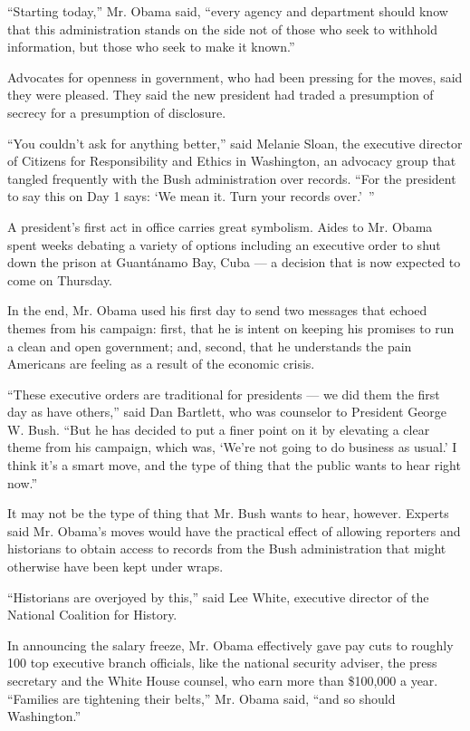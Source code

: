``Starting today,'' Mr. Obama said, ``every agency and department should
know that this administration stands on the side not of those who seek
to withhold information, but those who seek to make it known.''

Advocates for openness in government, who had been pressing for the
moves, said they were pleased. They said the new president had traded a
presumption of secrecy for a presumption of disclosure.

``You couldn't ask for anything better,'' said Melanie Sloan, the
executive director of Citizens for Responsibility and Ethics in
Washington, an advocacy group that tangled frequently with the Bush
administration over records. ``For the president to say this on Day 1
says: `We mean it. Turn your records over.'~''

A president's first act in office carries great symbolism. Aides to Mr.
Obama spent weeks debating a variety of options including an executive
order to shut down the prison at Guantánamo Bay, Cuba --- a decision
that is now expected to come on Thursday.

In the end, Mr. Obama used his first day to send two messages that
echoed themes from his campaign: first, that he is intent on keeping his
promises to run a clean and open government; and, second, that he
understands the pain Americans are feeling as a result of the economic
crisis.

``These executive orders are traditional for presidents --- we did them
the first day as have others,'' said Dan Bartlett, who was counselor to
President George W. Bush. ``But he has decided to put a finer point on
it by elevating a clear theme from his campaign, which was, `We're not
going to do business as usual.' I think it's a smart move, and the type
of thing that the public wants to hear right now.''

It may not be the type of thing that Mr. Bush wants to hear, however.
Experts said Mr. Obama's moves would have the practical effect of
allowing reporters and historians to obtain access to records from the
Bush administration that might otherwise have been kept under wraps.

``Historians are overjoyed by this,'' said Lee White, executive director
of the National Coalition for History.

In announcing the salary freeze, Mr. Obama effectively gave pay cuts to
roughly 100 top executive branch officials, like the national security
adviser, the press secretary and the White House counsel, who earn more
than \$100,000 a year. ``Families are tightening their belts,'' Mr.
Obama said, ``and so should Washington.''

